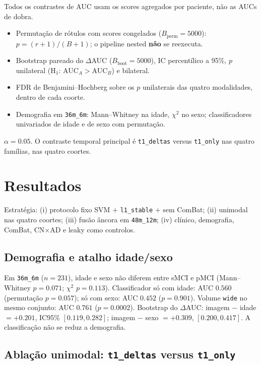 \documentclass[review]{elsarticle}
\newcommand{\code}[1]{\texttt{#1}}
\begin{document}
	Todos os contrastes de AUC usam os scores agregados por paciente, não as AUCs de dobra.
	\begin{itemize}
		\item Permutação de rótulos com scores congelados ($B_{\mathrm{perm}}=5000$): $p=(r+1)/(B+1)$; o pipeline nested \textbf{não} se reexecuta.
		\item Bootstrap pareado do $\Delta$AUC ($B_{\mathrm{boot}}=5000$), IC percentílico a 95\%, $p$ unilateral (H$_1$: AUC$_A>$AUC$_B$) e bilateral.
		\item FDR de Benjamini--Hochberg sobre os $p$ unilaterais das quatro modalidades, dentro de cada coorte.
		\item Demografia em \code{36m\_6m}: Mann--Whitney na idade, $\chi^2$ no sexo; classificadores univariados de idade e de sexo com permutação.
	\end{itemize}
	$\alpha=0.05$.
	O contraste temporal principal é \code{t1\_deltas} versus \code{t1\_only} nas quatro famílias, nas quatro coortes.
	
	\section{Resultados}
	\label{sec:resultados}
	
	Estratégia: (i) protocolo fixo SVM $+$ \code{l1\_stable} $+$ sem ComBat; (ii) unimodal nas quatro coortes; (iii) fusão âncora em \code{48m\_12m}; (iv) clínico, demografia, ComBat, CN$\times$AD e leaky como controlos.
	
	\subsection{Demografia e atalho idade/sexo}
	\label{subsec:demo}
	
	Em \code{36m\_6m} ($n=231$), idade e sexo não diferem entre sMCI e pMCI (Mann--Whitney $p=0.071$; $\chi^2$ $p=0.113$).
	Classificador só com idade: AUC $0.560$ (permutação $p=0.057$); só com sexo: AUC $0.452$ ($p=0.901$).
	Volume \code{wide} no mesmo conjunto: AUC $0.761$ ($p=0.0002$).
	Bootstrap do $\Delta$AUC: imagem $-$ idade $=+0.201$, IC95\% $[0.119,0.282]$; imagem $-$ sexo $=+0.309$, $[0.200,0.417]$.
	A classificação não se reduz a demografia.
	
	\subsection{Ablação unimodal: \texorpdfstring{\code{t1\_deltas}}{t1\_deltas} versus \texorpdfstring{\code{t1\_only}}{t1\_only}}
	\label{subsec:unimodal}
	
\end{document}
